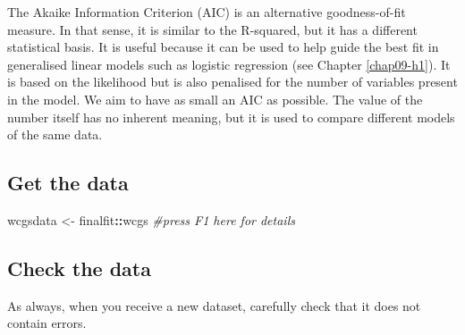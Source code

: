 \documentclass[
  12pt,
  krantz2]{krantz}
\makeatletter
\newenvironment{Shaded}{\begin{snugshade}}{\end{snugshade}}
\newcommand{\CommentTok}[1]{\textcolor[rgb]{0.56,0.35,0.01}{\textit{#1}}}
\newcommand{\NormalTok}[1]{#1}
\newcommand{\OperatorTok}[1]{\textcolor[rgb]{0.81,0.36,0.00}{\textbf{#1}}}
\newcommand{\StringTok}[1]{\textcolor[rgb]{0.31,0.60,0.02}{#1}}
\newenvironment{kframe}{%
\medskip{}
\setlength{\fboxsep}{.8em}
 \def\at@end@of@kframe{}%
 \ifinner\ifhmode%
  \def\at@end@of@kframe{\end{minipage}}%
  \begin{minipage}{\columnwidth}%
 \fi\fi%
 \def\FrameCommand##1{\hskip\@totalleftmargin \hskip-\fboxsep
 \colorbox{shadecolor}{##1}\hskip-\fboxsep
     \hskip-\linewidth \hskip-\@totalleftmargin \hskip\columnwidth}%
 \MakeFramed {\advance\hsize-\width
   \@totalleftmargin\z@ \linewidth\hsize
   \@setminipage}}%
 {\par\unskip\endMakeFramed%
 \at@end@of@kframe}
\renewenvironment{Shaded}{\begin{kframe}}{\end{kframe}}
\makeatother
\begin{document}
The Akaike Information Criterion (AIC) is an alternative goodness-of-fit measure.
In that sense, it is similar to the R-squared, but it has a different statistical basis.
It is useful because it can be used to help guide the best fit in generalised linear models such as logistic regression (see Chapter \ref{chap09-h1}).
It is based on the likelihood but is also penalised for the number of variables present in the model.
We aim to have as small an AIC as possible.
The value of the number itself has no inherent meaning, but it is used to compare different models of the same data.

\hypertarget{get-the-data-3}{%
\subsection{Get the data}\label{get-the-data-3}}

\begin{Shaded}
\begin{Highlighting}[]
\NormalTok{wcgsdata <-}\StringTok{ }\NormalTok{finalfit}\OperatorTok{::}\NormalTok{wcgs }\CommentTok{#press F1 here for details}
\end{Highlighting}
\end{Shaded}

\hypertarget{check-the-data-1}{%
\subsection{Check the data}\label{check-the-data-1}}

As always, when you receive a new dataset, carefully check that it does not contain errors.

\begin{table}[!h]

\caption{\label{tab:unnamed-chunk-23}WCGS data, ff\_glimpse: continuous.}
\centering
{}
\end{table}
\end{document}
